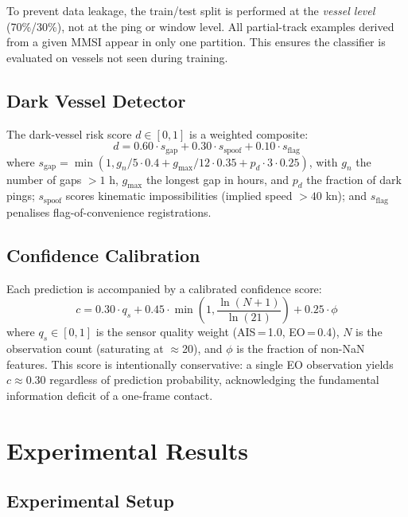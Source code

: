 \documentclass[journal]{IEEEtran}
\begin{document}
To prevent data leakage, the train/test split is performed at the
\emph{vessel level} (70\%/30\%), not at the ping or window level.
All partial-track examples derived from a given MMSI appear in only
one partition. This ensures the classifier is evaluated on vessels not
seen during training.

\subsection{Dark Vessel Detector}

The dark-vessel risk score $d \in [0,1]$ is a weighted composite:
\begin{equation}
  d = 0.60 \cdot s_\text{gap} + 0.30 \cdot s_\text{spoof} + 0.10 \cdot s_\text{flag}
  \label{eq:dark}
\end{equation}
where $s_\text{gap} = \min(1, g_n/5 \cdot 0.4 + g_{\max}/12 \cdot 0.35
+ p_d \cdot 3 \cdot 0.25)$, with $g_n$ the number of gaps $>1$ h,
$g_{\max}$ the longest gap in hours, and $p_d$ the fraction of dark pings;
$s_\text{spoof}$ scores kinematic impossibilities (implied speed $>40$ kn);
and $s_\text{flag}$ penalises flag-of-convenience registrations.

\subsection{Confidence Calibration}

Each prediction is accompanied by a calibrated confidence score:
\begin{equation}
  c = 0.30 \cdot q_s + 0.45 \cdot \min\!\left(1, \frac{\ln(N+1)}{\ln(21)}\right)
      + 0.25 \cdot \phi
  \label{eq:confidence}
\end{equation}
where $q_s \in [0,1]$ is the sensor quality weight (AIS\,=\,1.0,
EO\,=\,0.4), $N$ is the observation count (saturating at $\approx$20),
and $\phi$ is the fraction of non-NaN features. This score is
intentionally conservative: a single EO observation yields $c \approx 0.30$
regardless of prediction probability, acknowledging the fundamental
information deficit of a one-frame contact.

\section{Experimental Results}
\label{sec:results}

\subsection{Experimental Setup}
\end{document}
